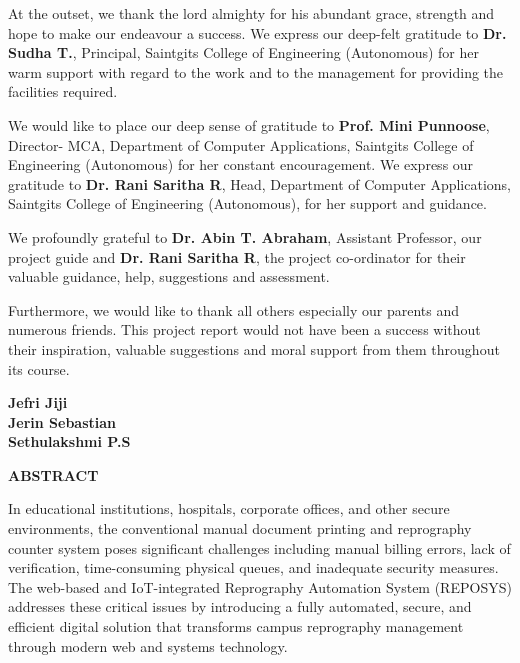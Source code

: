 \documentclass[12pt,a4paper]{report}
\begin{document}
\begin{doublespace}
At the outset, we thank the lord almighty for his abundant grace, strength and hope to make our endeavour a success. We express our deep-felt gratitude to \textbf{Dr. Sudha T.}, Principal, Saintgits College of Engineering (Autonomous) for her warm support with regard to the work and to the management for providing the facilities required.

We would like to place our deep sense of gratitude to \textbf{Prof. Mini Punnoose}, Director- MCA, Department of Computer Applications, Saintgits College of Engineering (Autonomous) for her constant encouragement. We express our gratitude to \textbf{Dr. Rani Saritha R}, Head, Department of Computer Applications, Saintgits College of Engineering (Autonomous), for her support and guidance.

We profoundly grateful to \textbf{Dr. Abin T. Abraham}, Assistant Professor, our project guide and \textbf{Dr. Rani Saritha R}, the project co-ordinator for their valuable guidance, help, suggestions and assessment.

Furthermore, we would like to thank all others especially our parents and numerous friends. This project report would not have been a success without their inspiration, valuable suggestions and moral support from them throughout its course.
\end{doublespace}

\vspace{0.6in}
\begin{flushright}
\textbf{Jefri Jiji}\\
\textbf{Jerin Sebastian}\\
\textbf{Sethulakshmi P.S}
\end{flushright}

\newpage
\thispagestyle{empty}
\begin{center}
{\bfseries\Large ABSTRACT\par}
\end{center}
\vspace{0.2in}

In educational institutions, hospitals, corporate offices, and other secure environments, the conventional manual document printing and reprography counter system poses significant challenges including manual billing errors, lack of verification, time-consuming physical queues, and inadequate security measures. The web-based and IoT-integrated Reprography Automation System (REPOSYS) addresses these critical issues by introducing a fully automated, secure, and efficient digital solution that transforms campus reprography management through modern web and systems technology.
\end{document}
